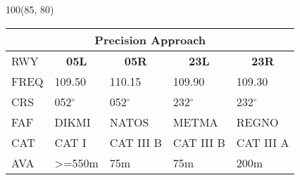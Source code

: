 \documentclass[10pt,landscape,a4paper]{article}
\begin{document}
\begin{textblock}{100}(85, 80)
\begin{table}[]
\begin{tabular}{lllll}
\multicolumn{5}{c}{\textbf{Precision Approach}} \\ \hline
\multicolumn{1}{|l|}{RWY} & \multicolumn{1}{c|}{\textbf{05L}} & \multicolumn{1}{c|}{\textbf{05R}} & \multicolumn{1}{c|}{\textbf{23L}} & \multicolumn{1}{c|}{\textbf{23R}} \\ \hline
\multicolumn{1}{|l|}{FREQ} & \multicolumn{1}{l|}{109.50} & \multicolumn{1}{l|}{110.15} & \multicolumn{1}{l|}{109.90} & \multicolumn{1}{l|}{109.30} \\
\multicolumn{1}{|l|}{CRS} & \multicolumn{1}{l|}{052$^\circ$} & \multicolumn{1}{l|}{052$^\circ$} & \multicolumn{1}{l|}{232$^\circ$} & \multicolumn{1}{l|}{232$^\circ$} \\
\multicolumn{1}{|l|}{FAF} & \multicolumn{1}{l|}{DIKMI} & \multicolumn{1}{l|}{NATOS} & \multicolumn{1}{l|}{METMA} & \multicolumn{1}{l|}{REGNO} \\
\multicolumn{1}{|l|}{CAT} & \multicolumn{1}{l|}{CAT I} & \multicolumn{1}{l|}{CAT III B} & \multicolumn{1}{l|}{CAT III B} & \multicolumn{1}{l|}{CAT III A} \\
\multicolumn{1}{|l|}{AVA} & \multicolumn{1}{l|}{\textgreater{}=550m} & \multicolumn{1}{l|}{75m} & \multicolumn{1}{l|}{75m} & \multicolumn{1}{l|}{200m} \\ \hline
\end{tabular}
\end{table}
\end{textblock}
\end{document}
